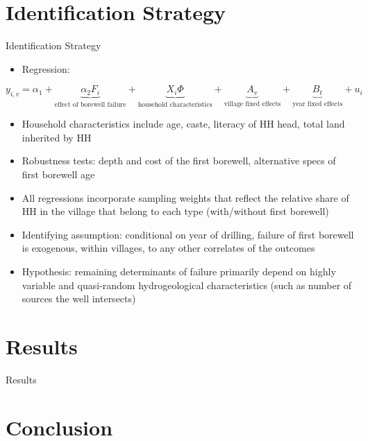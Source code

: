 \documentclass[10pt]{beamer}
\begin{document}
\section{Identification Strategy}
\begin{frame}
	{Identification Strategy}
	\begin{itemize}
		\item Regression:
	\end{itemize}
	\begin{equation}
		y_{i,v} = \alpha_1 + \underbrace{\alpha_2 F_i}_{\text{effect of borewell failure}} + \underbrace{X_i \Phi}_{\text{household characteristics}} + \underbrace{A_v}_{\text{village fixed effects}} + \underbrace{B_t}_{\text{year fixed effects}} + u_i
	\end{equation}
	\begin{itemize}
		\item Household characteristics include age, caste, literacy of HH head, total land inherited by HH
		\item Robustness tests: depth and cost of the first borewell, alternative specs of first borewell age
		\item All regressions incorporate sampling weights that reflect the relative share of HH in the village that belong to each type (with/without first borewell)
		\item Identifying assumption: conditional on year of drilling, failure of first borewell is exogenous, within villages, to any other correlates of the outcomes
		\item Hypothesis: remaining determinants of failure primarily depend on highly variable and quasi-random hydrogeological characteristics (such as number of sources the well intersects)
	\end{itemize}
\end{frame}


\section{Results}
\begin{frame}
	{Results}
\end{frame}

\section{Conclusion}
\end{document}
